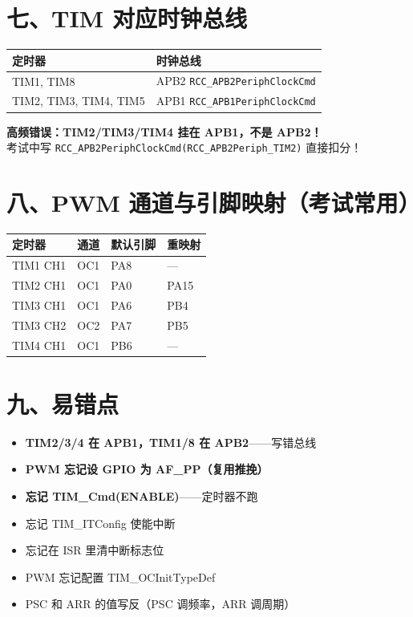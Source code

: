 \documentclass[10pt,a4paper,oneside]{ctexart}
\newcommand{\danger}[1]{\textcolor{accent}{\textbf{#1}}}
\begin{document}
\section*{七、TIM 对应时钟总线}

\begin{center}
\begin{tabular}{@{}ll@{}}
    \toprule
    \textbf{定时器} & \textbf{时钟总线} \\
    \midrule
    TIM1, TIM8    & APB2 \quad \texttt{RCC\_APB2PeriphClockCmd} \\
    TIM2, TIM3, TIM4, TIM5 & APB1 \quad \texttt{RCC\_APB1PeriphClockCmd} \\
    \bottomrule
\end{tabular}
\end{center}

\begin{warnbox}
    \danger{高频错误：TIM2/TIM3/TIM4 挂在 APB1，不是 APB2！}\\
    考试中写 \texttt{RCC\_APB2PeriphClockCmd(RCC\_APB2Periph\_TIM2)} 直接扣分！
\end{warnbox}

\section*{八、PWM 通道与引脚映射（考试常用）}

\begin{center}
\begin{tabular}{@{}llll@{}}
    \toprule
    \textbf{定时器} & \textbf{通道} & \textbf{默认引脚} & \textbf{重映射} \\
    \midrule
    TIM1 CH1 & OC1 & PA8 & --- \\
    TIM2 CH1 & OC1 & PA0 & PA15 \\
    TIM3 CH1 & OC1 & PA6 & PB4 \\
    TIM3 CH2 & OC2 & PA7 & PB5 \\
    TIM4 CH1 & OC1 & PB6 & --- \\
    \bottomrule
\end{tabular}
\end{center}

\section*{九、易错点}

\begin{warnbox}
    \begin{itemize}
        \item \danger{TIM2/3/4 在 APB1，TIM1/8 在 APB2}——写错总线
        \item \danger{PWM 忘记设 GPIO 为 AF\_PP（复用推挽）}
        \item \danger{忘记 TIM\_Cmd(ENABLE)}——定时器不跑
        \item 忘记 TIM\_ITConfig 使能中断
        \item 忘记在 ISR 里清中断标志位
        \item PWM 忘记配置 TIM\_OCInitTypeDef
        \item PSC 和 ARR 的值写反（PSC 调频率，ARR 调周期）
    \end{itemize}
\end{warnbox}
\end{document}
